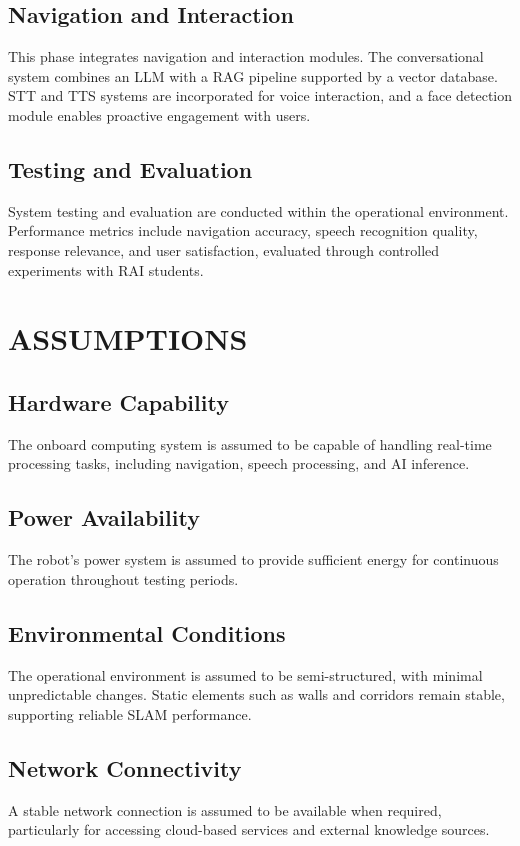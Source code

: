 \subsection{Navigation and Interaction}
This phase integrates navigation and interaction modules. The conversational system combines an LLM with a RAG pipeline supported by a vector database. STT and TTS systems are incorporated for voice interaction, and a face detection module enables proactive engagement with users.

\subsection{Testing and Evaluation}
System testing and evaluation are conducted within the operational environment. Performance metrics include navigation accuracy, speech recognition quality, response relevance, and user satisfaction, evaluated through controlled experiments with RAI students.

\section{ASSUMPTIONS}

\subsection{Hardware Capability}
The onboard computing system is assumed to be capable of handling real-time processing tasks, including navigation, speech processing, and AI inference.

\subsection{Power Availability}
The robot’s power system is assumed to provide sufficient energy for continuous operation throughout testing periods.

\subsection{Environmental Conditions}
The operational environment is assumed to be semi-structured, with minimal unpredictable changes. Static elements such as walls and corridors remain stable, supporting reliable SLAM performance.

\subsection{Network Connectivity}
A stable network connection is assumed to be available when required, particularly for accessing cloud-based services and external knowledge sources.


